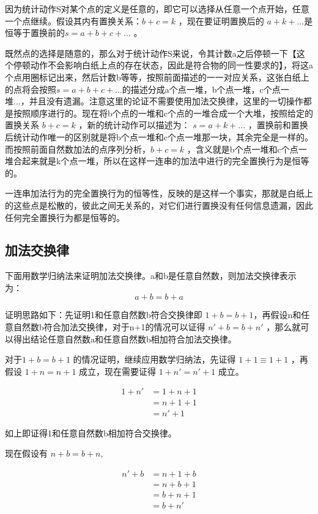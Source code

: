 \documentclass[12pt,oneside]{book}
\begin{document}
因为统计动作S对某个点的定义是任意的，即它可以选择从任意一个点开始，任意一个点继续。假设其内有置换关系：$b+c=k$ ，现在要证明置换后的 $a+k+...$是恒等于置换前的$s=a+b+c+...$ 。

既然点的选择是随意的，那么对于统计动作S来说，令其计数a之后停顿一下【这个停顿动作不会影响白纸上点的存在状态，因此是符合物的同一性要求的】，将这a个点用圈标记出来，然后计数b等等，按照前面描述的一一对应关系，这张白纸上的点将会按照$s=a+b+c+...$的描述分成a个点一堆，b个点一堆，c个点一堆...，并且没有遗漏。注意这里的论证不需要使用加法交换律，这里的一切操作都是按照顺序进行的。现在将b个点的一堆和c个点的一堆合成一个大堆，按照给定的置换关系 $b+c=k$ ，新的统计动作可以描述为： $s=a+k+...$ ，置换前和置换后统计动作唯一的区别就是将b个点一堆和c个点一堆那一块，其余完全是一样的。而按照前面自然数加法的点序列分析，$b+c=k$ ，含义就是b个点一堆和c个点一堆合起来就是k个点一堆，所以在这样一连串的加法中进行的完全置换行为是恒等的。

一连串加法行为的完全置换行为的恒等性，反映的是这样一个事实，那就是白纸上的这些点是松散的，彼此之间无关系的，对它们进行置换没有任何信息遗漏，因此任何完全置换行为都是恒等的。


\subsection{加法交换律}
下面用数学归纳法来证明加法交换律。a和b是任意自然数，则加法交换律表示为：
\begin{equation}
a+b=b+a
\end{equation}

证明思路如下：先证明1和任意自然数b符合交换律即 $1+b = b+1$，再假设n和任意自然数b符合加法交换律，对于n+1的情况可以证得 $n'+b=b+n'$ ，那么就可以得出结论任意自然数a和任意自然数b相加符合加法交换律。

对于$1+b=b+1$ 的情况证明，继续应用数学归纳法，先证得 $1+1\equiv 1+1$ ，再假设 $1+n=n+1$ 成立，现在需要证得 $1+n'=n'+1$ 成立。

\begin{align}
1+n' &= 1+n+1\\
        &= n+1+1 \\
        &=n'+1
\end{align}

如上即证得1和任意自然数b相加符合交换律。

现在假设有 $n+b=b+n$,

\begin{align}
n'+b &=n+1+b\\
        &=n+b+1\\
        &=b+n+1\\
        &=b+n'
\end{align}
\end{document}
